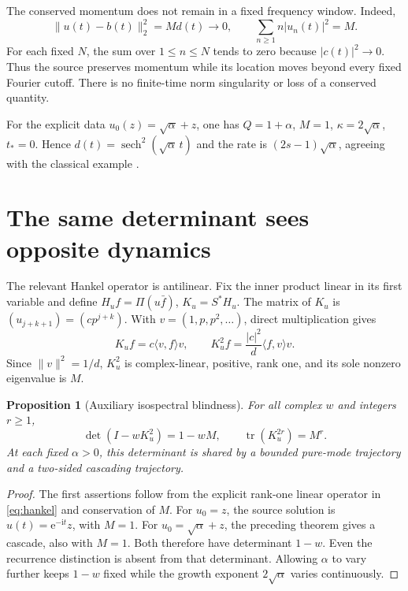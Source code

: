 \documentclass[10pt]{article}
\newcommand{\ii}{\mathrm i}
\newcommand{\e}{\mathrm e}
\DeclareMathOperator{\sech}{sech}
\DeclareMathOperator{\tr}{tr}
\newtheorem{proposition}{Proposition}
\begin{document}
The conserved momentum does not remain in a fixed frequency window.
Indeed,
\begin{equation}
 \|u(t)-b(t)\|_2^2=Md(t)\longrightarrow0,\qquad
 \sum_{n\ge1}n|u_n(t)|^2=M.
 \label{eq:escape}
\end{equation}
For each fixed $N$, the sum over $1\le n\le N$ tends to zero because
$|c(t)|^2\to0$. Thus the source preserves momentum while its location moves
beyond every fixed Fourier cutoff. There is no finite-time norm singularity
or loss of a conserved quantity.

For the explicit data $u_0(z)=\sqrt\alpha+z$, one has
$Q=1+\alpha$, $M=1$, $\kappa=2\sqrt\alpha$, $t_*=0$.
Hence $d(t)=\sech^2(\sqrt\alpha\,t)$ and the rate is
$(2s-1)\sqrt\alpha$, agreeing with the classical example
\cite[Theorem 3.2]{xu2014}.

\section{The same determinant sees opposite dynamics}
The relevant Hankel operator is antilinear. Fix the inner product linear
in its first variable and define
$H_uf=\Pi(u\bar f)$, $K_u=S^*H_u$.
The matrix of $K_u$ is $(u_{j+k+1})=(cp^{j+k})$.
With $v=(1,p,p^2,\ldots)$, direct multiplication gives
\begin{equation}
 K_uf=c\langle v,f\rangle v,\qquad
 K_u^2f=\frac{|c|^2}{d}\langle f,v\rangle v.
 \label{eq:hankel}
\end{equation}
Since $\|v\|^2=1/d$, $K_u^2$ is complex-linear, positive, rank one,
and its sole nonzero eigenvalue is $M$.

\begin{proposition}[Auxiliary isospectral blindness]
For all complex $w$ and integers $r\ge1$,
\begin{equation}
 \det(I-wK_u^2)=1-wM,\qquad \tr(K_u^{2r})=M^r.
 \label{eq:det}
\end{equation}
At each fixed $\alpha>0$, this determinant is shared by a bounded pure-mode
trajectory and a two-sided cascading trajectory.
\end{proposition}
\begin{proof}
The first assertions follow from the explicit rank-one linear operator in
\eqref{eq:hankel} and conservation of $M$.
For $u_0=z$, the source solution is $u(t)=\e^{-\ii t}z$, with $M=1$.
For $u_0=\sqrt\alpha+z$, the preceding theorem gives a cascade, also with
$M=1$. Both therefore have determinant $1-w$.
Even the recurrence distinction is absent from that determinant.
Allowing $\alpha$ to vary further keeps $1-w$ fixed while the growth exponent
$2\sqrt\alpha$ varies continuously.
\end{proof}
\end{document}
